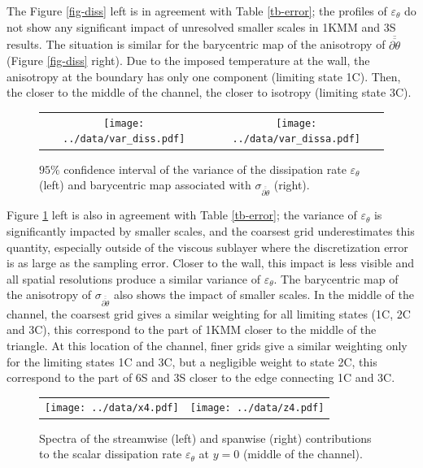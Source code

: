 \documentclass[review]{elsarticle}
\newcommand{\epst}{\varepsilon_\theta}
\begin{document}
The Figure \ref{fig-diss} left is in agreement with Table \ref{tb-error}; the profiles of $\epst$ do not show any significant impact of unresolved smaller scales in 1KMM and 3S results. The situation is similar for the barycentric map of the anisotropy of $\overline{\overline{\partial \theta}}$ (Figure \ref{fig-diss} right). Due to the imposed temperature at the wall, the anisotropy at the boundary has only one component (limiting state 1C). Then, the closer to the middle of the channel, the closer to isotropy (limiting state 3C).

\begin{figure}[htbp]
\begin{center}
\begin{tabular}{cc}
\texttt{[image: ../data/var\_diss.pdf]} & 
\texttt{[image: ../data/var\_dissa.pdf]}
\end{tabular}
\end{center}
\caption{$95 \%$ confidence interval of the variance of the dissipation rate $\epst$ (left) and barycentric map associated with $\sigma_{\overline{\overline{\partial \theta}}}$ (right).}
\label{fig-var_diss}
\end{figure}

Figure \ref{fig-var_diss} left is also in agreement with Table \ref{tb-error}; the variance of $\epst$ is significantly impacted by smaller scales, and the coarsest grid underestimates this quantity, especially outside of the viscous sublayer where the discretization error is as large as the sampling error. Closer to the wall, this impact is less visible and all spatial resolutions produce a similar variance of $\epst$. The barycentric map of the anisotropy of $\sigma_{\overline{\overline{\partial \theta}}}$ also shows the impact of smaller scales. In the middle of the channel, the coarsest grid gives a similar weighting for all limiting states (1C, 2C and 3C), this correspond to the part of 1KMM closer to the middle of the triangle. At this location of the channel, finer grids give a similar weighting only for the limiting states 1C and 3C, but a negligible weight to state 2C, this correspond to the part of 6S and 3S closer to the edge connecting 1C and 3C.

\begin{figure}[htbp]
\begin{center}
\begin{tabular}{cc}
\texttt{[image: ../data/x4.pdf]} & 
\texttt{[image: ../data/z4.pdf]}
\end{tabular}
\end{center}
\caption{Spectra of the streamwise (left) and spanwise (right) contributions to the scalar dissipation rate $\epst$ at $y=0$ (middle of the channel).}
\label{fig-spec}
\end{figure}
\end{document}
